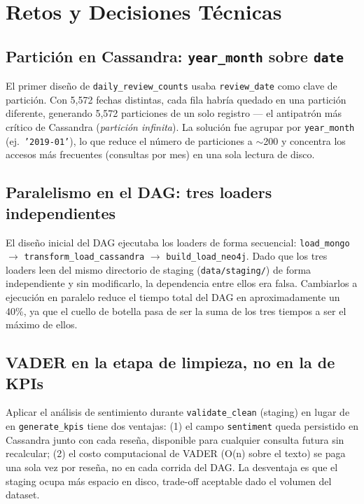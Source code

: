 \documentclass[12pt,a4paper]{article}
\begin{document}
\section{Retos y Decisiones Técnicas}

\subsection{Partición en Cassandra: \texttt{year\_month} sobre \texttt{date}}

El primer diseño de \texttt{daily\_review\_counts} usaba \texttt{review\_date} como clave de
partición. Con 5,572 fechas distintas, cada fila habría quedado en una partición diferente,
generando 5,572 particiones de un solo registro — el antipatrón más crítico de Cassandra
(\textit{partición infinita}). La solución fue agrupar por \texttt{year\_month} (ej.\
\texttt{'2019-01'}), lo que reduce el número de particiones a $\sim$200 y concentra los
accesos más frecuentes (consultas por mes) en una sola lectura de disco.

\subsection{Paralelismo en el DAG: tres loaders independientes}

El diseño inicial del DAG ejecutaba los loaders de forma secuencial:
\texttt{load\_mongo} $\to$ \texttt{transform\_load\_cassandra} $\to$ \texttt{build\_load\_neo4j}.
Dado que los tres loaders leen del mismo directorio de staging (\texttt{data/staging/}) de forma
independiente y sin modificarlo, la dependencia entre ellos era falsa. Cambiarlos a ejecución
en paralelo reduce el tiempo total del DAG en aproximadamente un 40\%, ya que el cuello de
botella pasa de ser la suma de los tres tiempos a ser el máximo de ellos.

\subsection{VADER en la etapa de limpieza, no en la de KPIs}

Aplicar el análisis de sentimiento durante \texttt{validate\_clean} (staging) en lugar de en
\texttt{generate\_kpis} tiene dos ventajas: (1) el campo \texttt{sentiment} queda persistido
en Cassandra junto con cada reseña, disponible para cualquier consulta futura sin recalcular;
(2) el costo computacional de VADER (O(n) sobre el texto) se paga una sola vez por reseña,
no en cada corrida del DAG. La desventaja es que el staging ocupa más espacio en disco, trade-off
aceptable dado el volumen del dataset.
\end{document}
